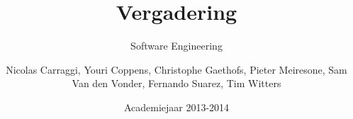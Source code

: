 \author{Nicolas Carraggi, Youri Coppens, Christophe Gaethofs, Pieter Meiresone, Sam Van den Vonder, Fernando Suarez, Tim Witters}
\title{Vergadering \MeetingDate}
\subtitle{Software Engineering} 
\date{Academiejaar 2013-2014}


\makeassignment